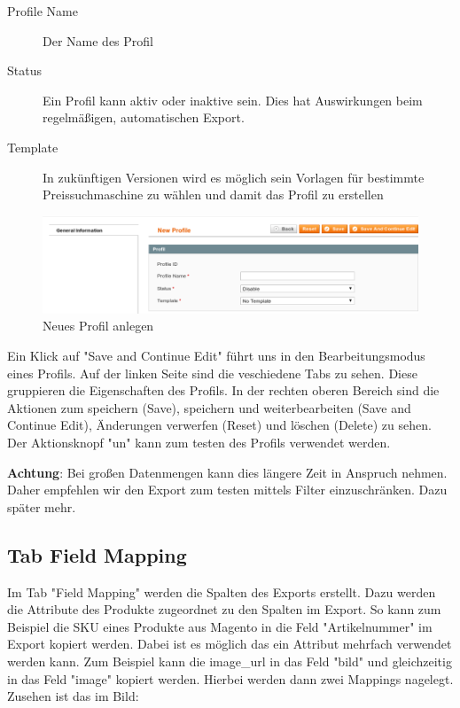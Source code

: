 \documentclass[a4paper,12pt]{book}
\begin{document}
\begin{description}
\item[Profile Name] Der Name des Profil
\item[Status] Ein Profil kann aktiv oder inaktive sein. Dies hat
Auswirkungen beim regelmäßigen, automatischen Export.
\item[Template] In zukünftigen Versionen wird es möglich sein Vorlagen
für bestimmte Preissuchmaschine zu wählen und damit das Profil zu
erstellen
\end{description}

\begin{figure}
 \includegraphics[width=1\textwidth]{img/bild03.png}
  \caption{Neues Profil anlegen}
  \label{figure:new_profile}
\end{figure}

Ein Klick auf "Save and Continue Edit" führt uns in den
Bearbeitungsmodus eines Profils. Auf der linken Seite sind die
veschiedene Tabs zu sehen. Diese gruppieren die Eigenschaften des
Profils. In der rechten oberen Bereich sind die Aktionen zum
speichern (Save), speichern und weiterbearbeiten (Save and Continue
Edit), Änderungen verwerfen (Reset) und löschen (Delete) zu sehen.
Der Aktionsknopf "un" kann zum testen des Profils verwendet werden.

\textbf{Achtung}: Bei großen Datenmengen kann dies längere Zeit in Anspruch
nehmen. Daher empfehlen wir den Export zum testen mittels Filter
einzuschränken. Dazu später mehr.

\subsection{Tab Field Mapping}
Im Tab "Field Mapping" werden die Spalten des Exports erstellt. Dazu
werden die Attribute des Produkte zugeordnet zu den Spalten im Export.
So kann zum Beispiel die SKU eines Produkte aus Magento in die Feld
"Artikelnummer" im Export kopiert werden. Dabei ist es möglich das ein
Attribut mehrfach verwendet werden kann. Zum Beispiel kann die
image\_url in das Feld "bild" und gleichzeitig in das Feld
"image" kopiert werden. Hierbei werden dann zwei Mappings
nagelegt. Zusehen ist das im Bild:
\end{document}
